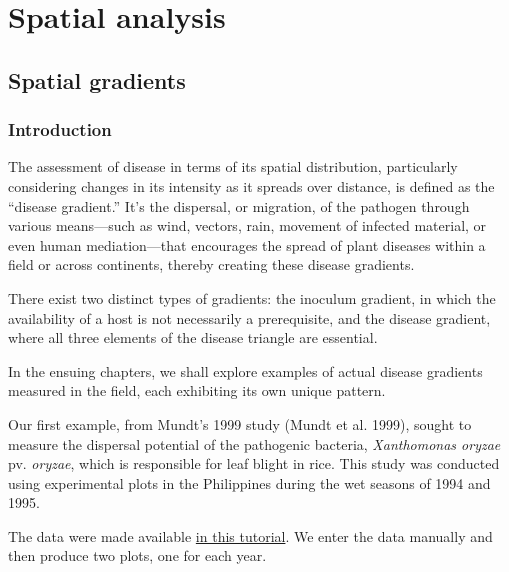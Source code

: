 \documentclass[
  letterpaper,
]{book}
\begin{document}
\part{Spatial analysis}

\hypertarget{spatial-gradients}{%
\chapter{Spatial gradients}\label{spatial-gradients}}

\hypertarget{introduction-1}{%
\section{Introduction}\label{introduction-1}}

The assessment of disease in terms of its spatial distribution,
particularly considering changes in its intensity as it spreads over
distance, is defined as the ``disease gradient.'' It's the dispersal, or
migration, of the pathogen through various means---such as wind,
vectors, rain, movement of infected material, or even human
mediation---that encourages the spread of plant diseases within a field
or across continents, thereby creating these disease gradients.

There exist two distinct types of gradients: the inoculum gradient, in
which the availability of a host is not necessarily a prerequisite, and
the disease gradient, where all three elements of the disease triangle
are essential.

In the ensuing chapters, we shall explore examples of actual disease
gradients measured in the field, each exhibiting its own unique pattern.

Our first example, from Mundt's 1999 study (Mundt et al. 1999), sought
to measure the dispersal potential of the pathogenic bacteria,
\emph{Xanthomonas oryzae} pv. \emph{oryzae}, which is responsible for
leaf blight in rice. This study was conducted using experimental plots
in the Philippines during the wet seasons of 1994 and 1995.

The data were made available
\href{https://www.apsnet.org/edcenter/disimpactmngmnt/topc/EcologyAndEpidemiologyInR/ModelingDispersalGradients/Pages/PrimaryDiseaseGradientsofBacteria.aspx}{in
this tutorial}. We enter the data manually and then produce two plots,
one for each year.
\end{document}
